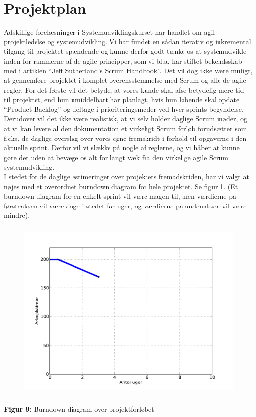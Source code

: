 \documentclass[12pt]{article}   %
\begin{document}
\section{Projektplan}
Adskillige forelæsninger i Systemudviklingskurset har handlet om agil projektledelse og systemudvikling. Vi har fundet en sådan iterativ og inkremental tilgang til projektet spændende og kunne derfor godt tænke os at systemudvikle inden for rammerne af de agile principper, som vi bl.a. har 
stiftet bekendsskab med i artiklen ``Jeff Sutherland's Scrum
Handbook''\cite{scrum}. Det vil dog ikke være muligt, at gennemføre projektet i komplet overensstemmelse med Scrum og alle de agile regler. For det første vil det betyde, at vores kunde skal afse betydelig mere tid til projektet, end hun umiddelbart har planlagt, hvis hun løbende skal opdate ``Product Backlog'' og deltage i prioriteringsmøder ved hver sprints begyndelse. Derudover vil det ikke være realistisk, at vi selv holder daglige Scrum møder,
og at vi kan levere al den dokumentation et virkeligt Scrum forløb forudsætter som f.eks. de daglige overslag over vores egne fremskridt i forhold til opgaverne i den aktuelle sprint. Derfor vil vi slække på nogle af 
reglerne, og vi håber at kunne gøre det uden at bevæge os alt for langt væk fra den virkelige agile Scrum systemudvikling.\\
I stedet for de daglige estimeringer over projektets fremadskriden, har vi valgt at nøjes med et overordnet burndown diagram for hele projektet. Se figur
\ref{fig:bd}. (Et burndown diagram for en enkelt sprint vil være magen til, men værdierne på førsteaksen vil være dage i stedet for uger, og værdierne på
andenaksen vil være mindre). 

\begin{figure}[!ht]
	\centering
\includegraphics[width=13cm, height=9cm]{burn2.pdf}
\label{fig:bd}
\end{figure}
\begin{center}
\textbf{Figur 9:} Burndown diagram over projektforløbet
\end{center}
\end{document}
